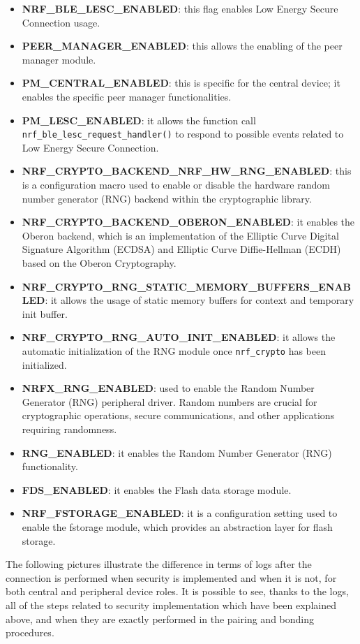 \documentclass{Configuration_Files/PoliMi3i_thesis}
\begin{document}
\begin{itemize}
    \item \textbf{NRF\_BLE\_LESC\_ENABLED}: this flag enables Low Energy Secure Connection usage.
    \item \textbf{PEER\_MANAGER\_ENABLED}: this allows the enabling of the peer manager module.
    \item \textbf{PM\_CENTRAL\_ENABLED}: this is specific for the central device; it enables the specific peer manager functionalities.
    \item \textbf{PM\_LESC\_ENABLED}: it allows the function call \texttt{nrf\_ble\_lesc\_request\_handler()} to respond to possible events related to Low Energy Secure Connection.
    \item \textbf{NRF\_CRYPTO\_BACKEND\_NRF\_HW\_RNG\_ENABLED}: this is a configuration macro used to enable or disable the hardware random number generator (RNG) backend within the cryptographic library.
    \item \textbf{NRF\_CRYPTO\_BACKEND\_OBERON\_ENABLED}: it enables the Oberon backend, which is an implementation of the Elliptic Curve Digital Signature Algorithm (ECDSA) and Elliptic Curve Diffie-Hellman (ECDH) based on the Oberon Cryptography.
    \item \textbf{NRF\_CRYPTO\_RNG\_STATIC\_MEMORY\_BUFFERS\_ENABLED}: it allows the usage of static memory buffers for context and temporary init buffer.
    \item \textbf{NRF\_CRYPTO\_RNG\_AUTO\_INIT\_ENABLED}: it allows the automatic initialization of the RNG module once \texttt{nrf\_crypto} has been initialized.
    \item \textbf{NRFX\_RNG\_ENABLED}: used to enable the Random Number Generator (RNG) peripheral driver. Random numbers are crucial for cryptographic operations, secure communications, and other applications requiring randomness.
    \item \textbf{RNG\_ENABLED}: it enables the Random Number Generator (RNG) functionality.
    \item \textbf{FDS\_ENABLED}: it enables the Flash data storage module.
    \item \textbf{NRF\_FSTORAGE\_ENABLED}: it is a configuration setting used to enable the fstorage module, which provides an abstraction layer for flash storage.
\end{itemize}

The following pictures illustrate the difference in terms of logs after the connection is performed when security is implemented and when it is not, for both central and peripheral device roles. It is possible to see, thanks to the logs, all of the steps related to security implementation which have been explained above, and when they are exactly performed in the pairing and bonding procedures.
\end{document}
